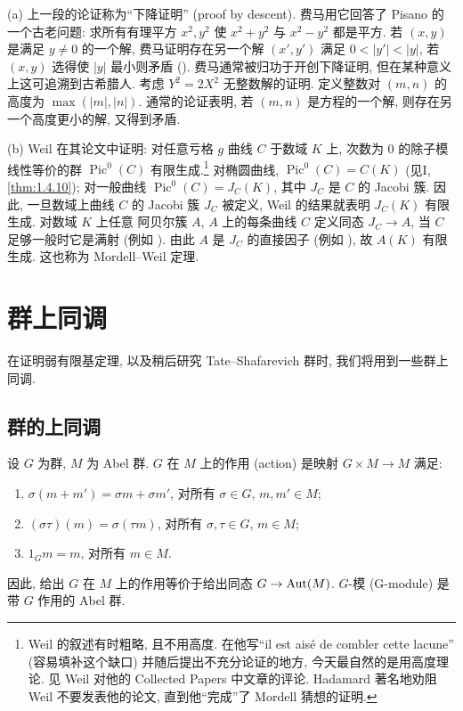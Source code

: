 \begin{remarkstar}
(a) 上一段的论证称为``下降证明'' (proof by descent). 费马用它回答了 Pisano 的一个古老问题: 求所有有理平方 $x^2, y^2$ 使 $x^2 + y^2$ 与 $x^2 - y^2$ 都是平方. 若 $(x,y)$ 是满足 $y\neq 0$ 的一个解, 费马证明存在另一个解 $(x', y')$ 满足 $0 < |y'| < |y|$, 若 $(x,y)$ 选得使 $|y|$ 最小则矛盾 (\cite[p.~207]{cassels1966}). 费马通常被归功于开创下降证明, 但在某种意义上这可追溯到古希腊人. 考虑 $Y^2 = 2X^2$ 无整数解的证明. 定义整数对 $(m,n)$ 的高度为 $\max(|m|, |n|)$. 通常的论证表明, 若 $(m,n)$ 是方程的一个解, 则存在另一个高度更小的解, 又得到矛盾.

(b) Weil 在其论文中证明: 对任意亏格 $g$ 曲线 $C$ 于数域 $K$ 上, 次数为 $0$ 的除子模线性等价的群 $\operatorname{Pic}^0(C)$ 有限生成.\footnote{Weil 的叙述有时粗略, 且不用高度. 在他写``il est ais\'e de combler cette lacune'' (容易填补这个缺口) 并随后提出不充分论证的地方, 今天最自然的是用高度理论. 见 Weil 对他的 Collected Papers 中文章的评论. Hadamard 著名地劝阻 Weil 不要发表他的论文, 直到他``完成''了 Mordell 猜想的证明.} 对椭圆曲线, $\operatorname{Pic}^0(C) = C(K)$ (见I, \ref{thm:1.4.10}); 对一般曲线 $\operatorname{Pic}^0(C) = J_C(K)$, 其中 $J_C$ 是 $C$ 的 Jacobi 簇. 因此, 一旦数域上曲线 $C$ 的 Jacobi 簇 $J_C$ 被定义, Weil 的结果就表明 $J_C(K)$ 有限生成. 对数域 $K$ 上任意 阿贝尔簇 $A$, $A$ 上的每条曲线 $C$ 定义同态 $J_C\to A$, 当 $C$ 足够一般时它是满射 (例如 \cite[10.1]{milne1986b}). 由此 $A$ 是 $J_C$ 的直接因子 (例如 \cite[12.1]{milne1986a}), 故 $A(K)$ 有限生成. 这也称为 Mordell--Weil 定理.
\end{remarkstar}

\section{群上同调}\label{sec:4.1}

在证明弱有限基定理, 以及稍后研究 Tate--Shafarevich 群时, 我们将用到一些群上同调.

\subsection*{群的上同调}

设 $G$ 为群, $M$ 为 Abel 群. $G$ 在 $M$ 上的作用 (action) 是映射 $G\times M\to M$ 满足:
\begin{enumerate}[label=\textup{(\alph*)}]
\item $\sigma(m + m') = \sigma m + \sigma m'$, 对所有 $\sigma\in G$, $m, m'\in M$;
\item $(\sigma\tau)(m) = \sigma(\tau m)$, 对所有 $\sigma, \tau\in G$, $m\in M$;
\item $1_G m = m$, 对所有 $m\in M$.
\end{enumerate}
因此, 给出 $G$ 在 $M$ 上的作用等价于给出同态 $G\to\operatorname{Aut}(M)$. $G$-模 (G-module) 是带 $G$ 作用的 Abel 群.

